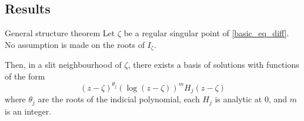 \documentclass[../main.tex]{subfiles}
\begin{document}
%
%	
%	
%	
%	
%	
%	
%	

\subsection{Results}


\begin{thm}{General structure theorem}
	Let $\zeta$ be a regular singular point of \eqref{basic_eq_diff}. No assumption is made on the roots of $I_\zeta$.
	
	Then, in a slit neighbourhood of $\zeta$, there exists a basis of solutions with functions of the form
	\begin{equation}\label{general_structure_form}
	{(z - \zeta)}^{\theta_j} {(\log (z - \zeta))}^m H_j (z - \zeta)
	\end{equation}
	where $\theta_j$ are the roots of the indicial polynomial, each $H_j$ is analytic at 0, and $m$ is an integer. 
\end{thm}



\end{document}
